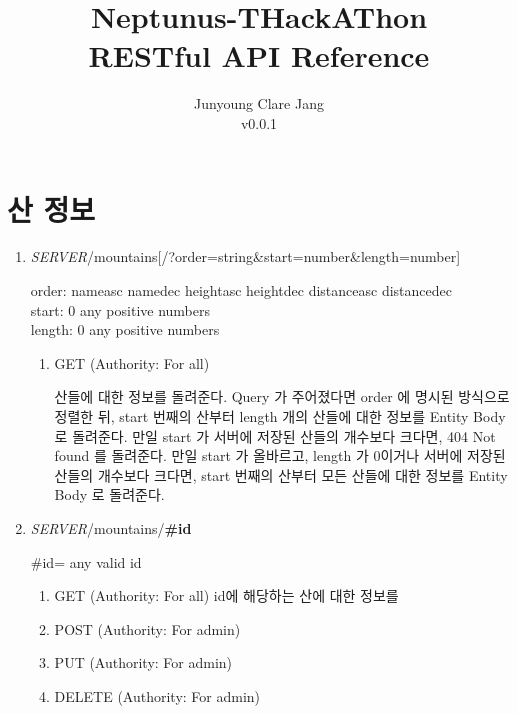 \documentclass{xoblivoir}
\title{Neptunus-THackAThon\\
\large{RESTful API Reference}}
\author{Junyoung Clare Jang\\
\normalsize{v0.0.1}}
\begin{document}
\maketitle
\section{산 정보}
\begin{enumerate}
\item \emph{SERVER}/mountains[/?order=string\&start=number\&length=number]
  
  order: nameasc \textbar{} namedec \textbar{} heightasc \textbar{} heightdec \textbar{} distanceasc \textbar{} distancedec\\
  start: 0 \textbar{} any positive numbers\\
  length: 0 \textbar{} any positive numbers
  \begin{enumerate}
  \item GET (Authority: For all)
    
    산들에 대한 정보를 돌려준다. Query 가 주어졌다면 order 에 명시된 방식으로 정렬한 뒤, start 번째의 산부터 length 개의 산들에 대한 정보를 Entity Body 로 돌려준다.
    만일 start 가 서버에 저장된 산들의 개수보다 크다면, 404 Not found 를 돌려준다.
    만일 start 가 올바르고, length 가 0이거나 서버에 저장된 산들의 개수보다 크다면, start 번째의 산부터 모든 산들에 대한 정보를 Entity Body 로 돌려준다.
  \end{enumerate}

\item \emph{SERVER}/mountains/\textbf{\#id}

  \#id= any valid id
  \begin{enumerate}
    \item GET (Authority: For all)
      id에 해당하는 산에 대한 정보를 
    \item POST (Authority: For admin)

    \item PUT (Authority: For admin)

    \item DELETE (Authority: For admin)
  \end{enumerate}
\end{enumerate}
\end{document}
